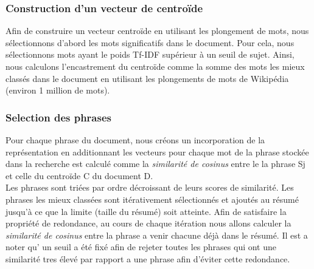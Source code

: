 \subsubsection{Construction d'un vecteur de centroïde}
Afin de construire un vecteur centroïde en utilisant les plongement de mots, nous sélectionnons d'abord les mots significatifs dans le document. Pour cela, nous sélectionnons mots ayant le poids Tf-IDF supérieur à un seuil de sujet. Ainsi, nous calculons l'encastrement du centroïde comme la somme des mots les mieux classés dans le document en utilisant les plongements de mots de Wikipédia (environ 1 million de mots). 


\subsubsection{Selection des phrases}
Pour chaque phrase du document, nous créons un incorporation de la représentation en additionnant les vecteurs pour chaque mot de la phrase stockée dans la recherche est calculé comme la \emph{similarité de cosinus} entre le la phrase Sj et celle du centroïde C du document D.\\
Les phrases sont triées par ordre décroissant de leurs scores de similarité. Les phrases les mieux classées sont itérativement sélectionnés et ajoutés au résumé jusqu'à ce que la limite (taille du résumé) soit atteinte. Afin de satisfaire la propriété de redondance, au cours de chaque itération nous allons calculer la \emph{similarité de cosinus} entre la phrase a venir chacune déjà dans le résumé.
Il est a noter qu' un seuil a été fixé afin de rejeter toutes les phrases qui ont une similarité tres élevé par rapport a une phrase afin d'éviter cette redondance.

